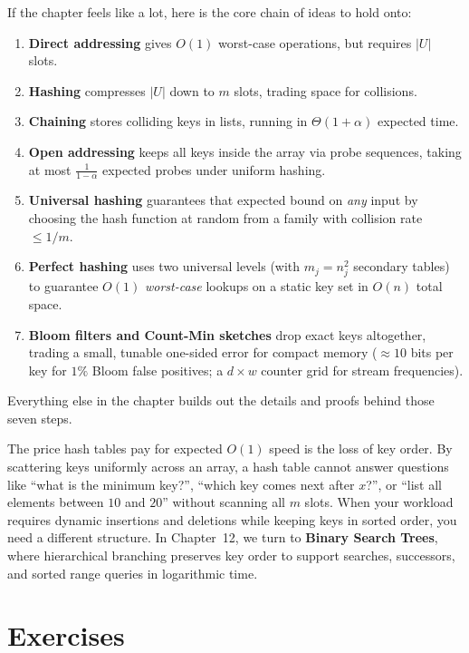 \begin{recoverybox}
If the chapter feels like a lot, here is the core chain of ideas to hold onto:
\begin{enumerate}
  \item \textbf{Direct addressing} gives $O(1)$ worst-case operations, but requires $|U|$ slots.
  \item \textbf{Hashing} compresses $|U|$ down to $m$ slots, trading space for collisions.
  \item \textbf{Chaining} stores colliding keys in lists, running in $\Theta(1+\alpha)$ expected time.
  \item \textbf{Open addressing} keeps all keys inside the array via probe sequences, taking at most $\frac{1}{1-\alpha}$ expected probes under uniform hashing.
  \item \textbf{Universal hashing} guarantees that expected bound on \emph{any} input by choosing the hash function at random from a family with collision rate $\le 1/m$.
  \item \textbf{Perfect hashing} uses two universal levels (with $m_j = n_j^2$ secondary tables) to guarantee $O(1)$ \emph{worst-case} lookups on a static key set in $O(n)$ total space.
  \item \textbf{Bloom filters and Count-Min sketches} drop exact keys altogether, trading a small, tunable one-sided error for compact memory ($\approx 10$ bits per key for $1\%$ Bloom false positives; a $d \times w$ counter grid for stream frequencies).
\end{enumerate}
Everything else in the chapter builds out the details and proofs behind those seven steps.
\end{recoverybox}

The price hash tables pay for expected $O(1)$ speed is
the loss of key order. By scattering keys uniformly across an array, a hash table
cannot answer questions like ``what is the minimum key?'', ``which key comes next
after $x$?'', or ``list all elements between $10$ and $20$'' without scanning all $m$
slots. When your workload requires dynamic insertions and deletions while keeping keys
in sorted order, you need a different structure. In Chapter~12, we turn to
\textbf{Binary Search Trees}, where hierarchical branching preserves key order to
support searches, successors, and sorted range queries in logarithmic time.

\section{Exercises}


